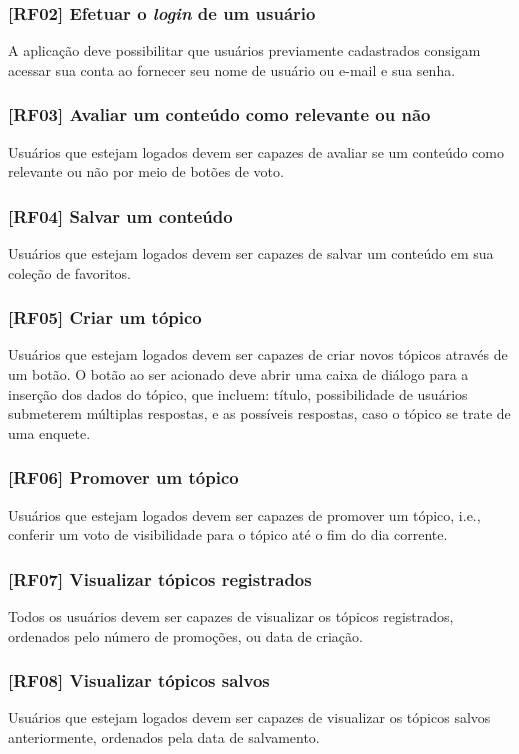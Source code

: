 \subsubsection{[RF02] Efetuar o \textit{login} de um usuário}
A aplicação deve possibilitar que usuários previamente cadastrados consigam acessar sua conta ao fornecer seu nome de usuário ou e-mail e sua senha.

\subsubsection{[RF03] Avaliar um conteúdo como relevante ou não}
Usuários que estejam logados devem ser capazes de avaliar se um conteúdo como relevante ou não por meio de botões de voto.

\subsubsection{[RF04] Salvar um conteúdo}
Usuários que estejam logados devem ser capazes de salvar um conteúdo em sua coleção de favoritos.

\subsubsection{[RF05] Criar um tópico}
Usuários que estejam logados devem ser capazes de criar novos tópicos através de um botão. O botão ao ser acionado deve abrir uma caixa de diálogo para a inserção dos dados do tópico, que incluem: título, possibilidade de usuários submeterem múltiplas respostas, e as possíveis respostas, caso o tópico se trate de uma enquete.

\subsubsection{[RF06] Promover um tópico}
Usuários que estejam logados devem ser capazes de promover um tópico, i.e., conferir um voto de visibilidade para o tópico até o fim do dia corrente.

\subsubsection{[RF07] Visualizar tópicos registrados}
Todos os usuários devem ser capazes de visualizar os tópicos registrados, ordenados pelo número de promoções, ou data de criação.

\subsubsection{[RF08] Visualizar tópicos salvos}
Usuários que estejam logados devem ser capazes de visualizar os tópicos salvos anteriormente, ordenados pela data de salvamento.


